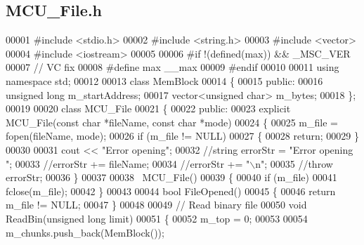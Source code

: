 \subsection{M\+C\+U\+\_\+\+File.\+h}
\label{MCU__File_8h_source}

\begin{DoxyCode}
00001 \textcolor{preprocessor}{#include <stdio.h>}
00002 \textcolor{preprocessor}{#include <string.h>}
00003 \textcolor{preprocessor}{#include <vector>}
00004 \textcolor{preprocessor}{#include <iostream>}
00005 
00006 \textcolor{preprocessor}{#if !(defined(max)) && \_MSC\_VER}
00007     \textcolor{comment}{// VC fix}
00008 \textcolor{preprocessor}{    #define max \_\_max}
00009 \textcolor{preprocessor}{#endif}
00010 
00011 \textcolor{keyword}{using namespace }std;
00012 
00013 \textcolor{keyword}{class }MemBlock
00014 \{
00015 \textcolor{keyword}{public}:
00016     \textcolor{keywordtype}{unsigned} \textcolor{keywordtype}{long} m_startAddress;
00017     vector<unsigned char> m_bytes;
00018 \};
00019 
00020 \textcolor{keyword}{class }MCU_File
00021 \{
00022 \textcolor{keyword}{public}:
00023     \textcolor{keyword}{explicit} MCU_File(\textcolor{keyword}{const} \textcolor{keywordtype}{char} *fileName, \textcolor{keyword}{const} \textcolor{keywordtype}{char} *mode)
00024     \{
00025         m\_file = fopen(fileName, mode);
00026         \textcolor{keywordflow}{if} (m\_file != NULL)
00027         \{
00028             \textcolor{keywordflow}{return};
00029         \}
00030 
00031         cout << \textcolor{stringliteral}{"Error opening"};
00032         \textcolor{comment}{//string errorStr = "Error opening ";}
00033         \textcolor{comment}{//errorStr += fileName;}
00034         \textcolor{comment}{//errorStr += "\(\backslash\)n";}
00035         \textcolor{comment}{//throw errorStr;}
00036     \}
00037 
00038     ~MCU_File()
00039     \{
00040         \textcolor{keywordflow}{if} (m\_file)
00041             fclose(m\_file);
00042     \}
00043 
00044     \textcolor{keywordtype}{bool} FileOpened()
00045     \{
00046         \textcolor{keywordflow}{return} m\_file != NULL;
00047     \}
00048 
00049     \textcolor{comment}{// Read binary file}
00050     \textcolor{keywordtype}{void} ReadBin(\textcolor{keywordtype}{unsigned} \textcolor{keywordtype}{long} limit)
00051     \{
00052         m\_top = 0;
00053 
00054         m\_chunks.push\_back(MemBlock());

\end{DoxyCode}
